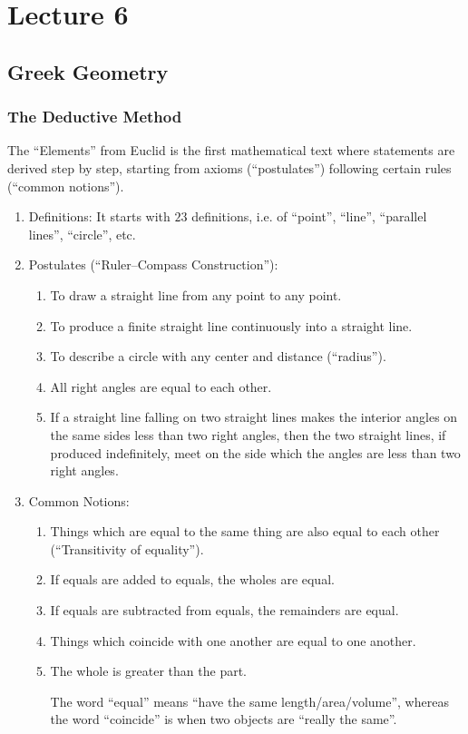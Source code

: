 \documentclass[class=article, crop=false]{standalone}
\begin{document}
  \section{Lecture 6}
  \subsection{Greek Geometry}
  \subsubsection{The Deductive Method}
  The ``Elements'' from Euclid is the first mathematical text where statements are derived step by step, starting from axioms (``postulates'') following certain rules (``common notions'').
  \begin{enumerate}[label=(\arabic*)]
    \item Definitions: It starts with $23$ definitions, i.e. of ``point'', ``line'', ``parallel lines'', ``circle'', etc.
    \item Postulates (``Ruler--Compass Construction''):
    \begin{enumerate}[label=(\alph*)]
      \item To draw a straight line from any point to any point.
      \item To produce a finite straight line continuously into a straight line.
      \item To describe a circle with any center and distance (``radius'').
      \item All right angles are equal to each other.
      \item If a straight line falling on two straight lines makes the interior angles on the same sides less than two right angles, then the two straight lines, if produced indefinitely, meet on the side which the angles are less than two right angles.
    \end{enumerate}
    \item Common Notions:
    \begin{enumerate}[label=(\alph*)]
      \item Things which are equal to the same thing are also equal to each other (``Transitivity of equality'').
      \item If equals are added to equals, the wholes are equal.
      \item If equals are subtracted from equals, the remainders are equal.
      \item Things which coincide with one another are equal to one another.
      \item The whole is greater than the part.
      \begin{note}{}
        The word ``equal'' means ``have the same length/area/volume'', whereas the word ``coincide'' is when two objects are ``really the same''.
      \end{note}
    \end{enumerate}
  \end{enumerate}
\end{document}
